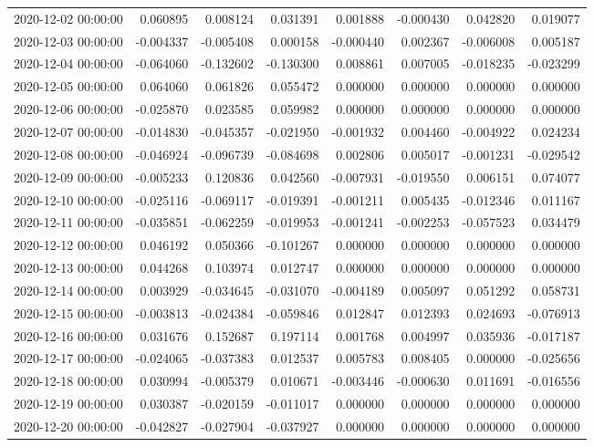 \begin{tabular}{lrrrrrrr}
2020-12-02 00:00:00 & 0.060895 & 0.008124 & 0.031391 & 0.001888 & -0.000430 & 0.042820 & 0.019077 \\
2020-12-03 00:00:00 & -0.004337 & -0.005408 & 0.000158 & -0.000440 & 0.002367 & -0.006008 & 0.005187 \\
2020-12-04 00:00:00 & -0.064060 & -0.132602 & -0.130300 & 0.008861 & 0.007005 & -0.018235 & -0.023299 \\
2020-12-05 00:00:00 & 0.064060 & 0.061826 & 0.055472 & 0.000000 & 0.000000 & 0.000000 & 0.000000 \\
2020-12-06 00:00:00 & -0.025870 & 0.023585 & 0.059982 & 0.000000 & 0.000000 & 0.000000 & 0.000000 \\
2020-12-07 00:00:00 & -0.014830 & -0.045357 & -0.021950 & -0.001932 & 0.004460 & -0.004922 & 0.024234 \\
2020-12-08 00:00:00 & -0.046924 & -0.096739 & -0.084698 & 0.002806 & 0.005017 & -0.001231 & -0.029542 \\
2020-12-09 00:00:00 & -0.005233 & 0.120836 & 0.042560 & -0.007931 & -0.019550 & 0.006151 & 0.074077 \\
2020-12-10 00:00:00 & -0.025116 & -0.069117 & -0.019391 & -0.001211 & 0.005435 & -0.012346 & 0.011167 \\
2020-12-11 00:00:00 & -0.035851 & -0.062259 & -0.019953 & -0.001241 & -0.002253 & -0.057523 & 0.034479 \\
2020-12-12 00:00:00 & 0.046192 & 0.050366 & -0.101267 & 0.000000 & 0.000000 & 0.000000 & 0.000000 \\
2020-12-13 00:00:00 & 0.044268 & 0.103974 & 0.012747 & 0.000000 & 0.000000 & 0.000000 & 0.000000 \\
2020-12-14 00:00:00 & 0.003929 & -0.034645 & -0.031070 & -0.004189 & 0.005097 & 0.051292 & 0.058731 \\
2020-12-15 00:00:00 & -0.003813 & -0.024384 & -0.059846 & 0.012847 & 0.012393 & 0.024693 & -0.076913 \\
2020-12-16 00:00:00 & 0.031676 & 0.152687 & 0.197114 & 0.001768 & 0.004997 & 0.035936 & -0.017187 \\
2020-12-17 00:00:00 & -0.024065 & -0.037383 & 0.012537 & 0.005783 & 0.008405 & 0.000000 & -0.025656 \\
2020-12-18 00:00:00 & 0.030994 & -0.005379 & 0.010671 & -0.003446 & -0.000630 & 0.011691 & -0.016556 \\
2020-12-19 00:00:00 & 0.030387 & -0.020159 & -0.011017 & 0.000000 & 0.000000 & 0.000000 & 0.000000 \\
2020-12-20 00:00:00 & -0.042827 & -0.027904 & -0.037927 & 0.000000 & 0.000000 & 0.000000 & 0.000000 \\

\end{tabular}
